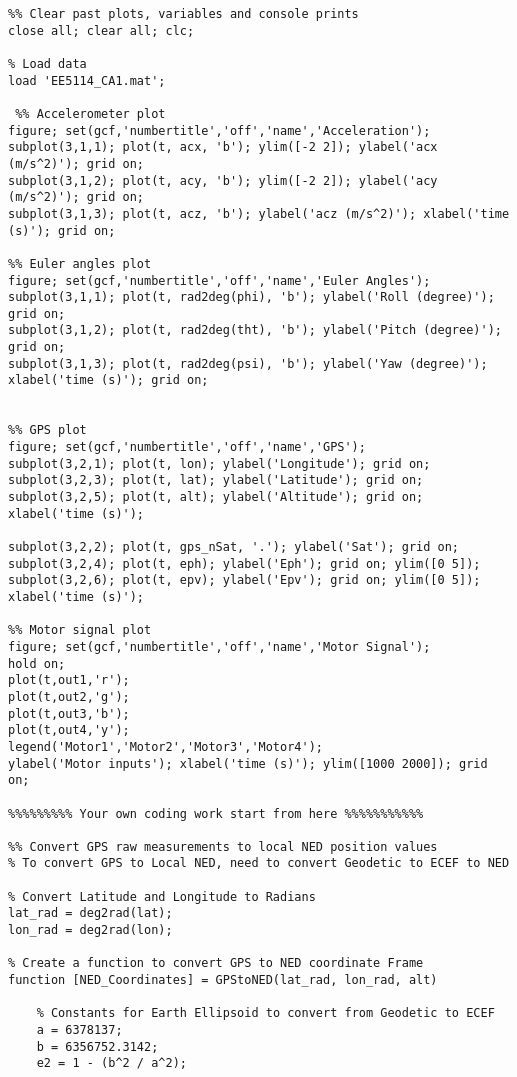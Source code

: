 \begin{lstlisting}
%% Clear past plots, variables and console prints
close all; clear all; clc;

% Load data 
load 'EE5114_CA1.mat';

 %% Accelerometer plot
figure; set(gcf,'numbertitle','off','name','Acceleration');  
subplot(3,1,1); plot(t, acx, 'b'); ylim([-2 2]); ylabel('acx (m/s^2)'); grid on; 
subplot(3,1,2); plot(t, acy, 'b'); ylim([-2 2]); ylabel('acy (m/s^2)'); grid on; 
subplot(3,1,3); plot(t, acz, 'b'); ylabel('acz (m/s^2)'); xlabel('time (s)'); grid on; 

%% Euler angles plot
figure; set(gcf,'numbertitle','off','name','Euler Angles');  
subplot(3,1,1); plot(t, rad2deg(phi), 'b'); ylabel('Roll (degree)'); grid on; 
subplot(3,1,2); plot(t, rad2deg(tht), 'b'); ylabel('Pitch (degree)'); grid on; 
subplot(3,1,3); plot(t, rad2deg(psi), 'b'); ylabel('Yaw (degree)'); xlabel('time (s)'); grid on; 


%% GPS plot
figure; set(gcf,'numbertitle','off','name','GPS');  
subplot(3,2,1); plot(t, lon); ylabel('Longitude'); grid on;
subplot(3,2,3); plot(t, lat); ylabel('Latitude'); grid on;
subplot(3,2,5); plot(t, alt); ylabel('Altitude'); grid on; xlabel('time (s)');

subplot(3,2,2); plot(t, gps_nSat, '.'); ylabel('Sat'); grid on;
subplot(3,2,4); plot(t, eph); ylabel('Eph'); grid on; ylim([0 5]);
subplot(3,2,6); plot(t, epv); ylabel('Epv'); grid on; ylim([0 5]); xlabel('time (s)');

%% Motor signal plot
figure; set(gcf,'numbertitle','off','name','Motor Signal');  
hold on;
plot(t,out1,'r');
plot(t,out2,'g');
plot(t,out3,'b');
plot(t,out4,'y');
legend('Motor1','Motor2','Motor3','Motor4'); 
ylabel('Motor inputs'); xlabel('time (s)'); ylim([1000 2000]); grid on;

%%%%%%%%% Your own coding work start from here %%%%%%%%%%%

%% Convert GPS raw measurements to local NED position values
% To convert GPS to Local NED, need to convert Geodetic to ECEF to NED

% Convert Latitude and Longitude to Radians
lat_rad = deg2rad(lat);
lon_rad = deg2rad(lon);

% Create a function to convert GPS to NED coordinate Frame
function [NED_Coordinates] = GPStoNED(lat_rad, lon_rad, alt)

    % Constants for Earth Ellipsoid to convert from Geodetic to ECEF
    a = 6378137;
    b = 6356752.3142;
    e2 = 1 - (b^2 / a^2);


\end{lstlisting}
